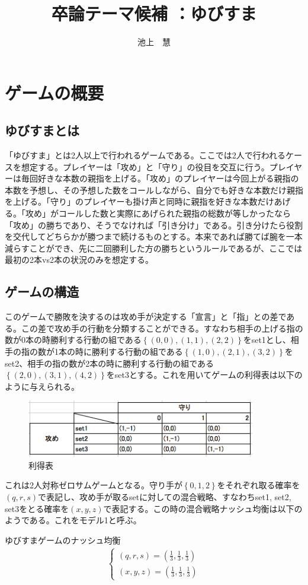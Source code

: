 \documentclass{jsarticle}
\begin{document}
\title{卒論テーマ候補 ：ゆびすま}
\author{池上　慧}
\maketitle

\section{ゲームの概要}
\subsection{ゆびすまとは}
「ゆびすま」とは2人以上で行われるゲームである。ここでは2人で行われるケースを想定する。プレイヤーは「攻め」と「守り」の役目を交互に行う。プレイヤーは毎回好きな本数の親指を上げる。「攻め」のプレイヤーは今回上がる親指の本数を予想し、その予想した数をコールしながら、自分でも好きな本数だけ親指を上げる。「守り」のプレイヤーも掛け声と同時に親指を好きな本数だけあげる。「攻め」がコールした数と実際にあげられた親指の総数が等しかったなら「攻め」の勝ちであり、そうでなければ「引き分け」である。引き分けたら役割を交代してどちらかが勝つまで続けるものとする。本来であれば勝てば腕を一本減らすことができ、先に二回勝利した方の勝ちというルールであるが、ここでは最初の2本vs2本の状況のみを想定する。

\subsection{ゲームの構造}
このゲームで勝敗を決するのは攻め手が決定する「宣言」と「指」との差である。この差で攻め手の行動を分類することができる。すなわち相手の上げる指の数が0本の時勝利する行動の組である$\left\{ (0,0), (1,1), (2,2)\right\}$をset1とし、相手の指の数が1本の時に勝利する行動の組である$\left\{ (1,0), (2,1), (3,2)\right\}$をset2、相手の指の数が2本の時に勝利する行動の組である$\left\{ (2,0), (3,1), (4,2)\right\}$をset3とする。これを用いてゲームの利得表は以下のように与えられる。
\begin{figure}[h]
    \centering
    \includegraphics[width=10cm]{pmat.png}
    \caption{利得表}
\end{figure}

これは2人対称ゼロサムゲームとなる。守り手が$\left\{ 0,1,2\right\}$をそれぞれ取る確率を$(q,r,s)$で表記し、攻め手が取るsetに対しての混合戦略、すなわちset1, set2, set3をとる確率を$(x,y,z)$で表記する。この時の混合戦略ナッシュ均衡は以下のようである。これをモデル1と呼ぶ。
\begin{itembox}[l]{ゆびすまゲームのナッシュ均衡}
    \begin{align}
    	\begin{cases}
		(q, r, s) = (\frac{1}{3}, \frac{1}{3}, \frac{1}{3})\\
		(x, y, z) = (\frac{1}{3}, \frac{1}{3}, \frac{1}{3})
	\end{cases}
    \end{align}
\end{itembox}
\end{document}
